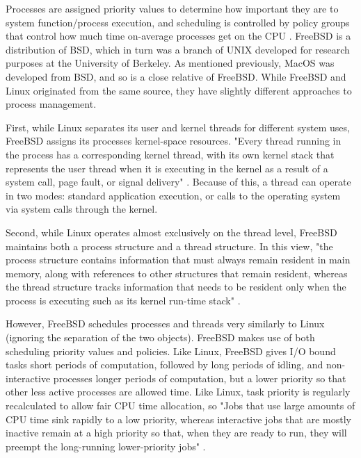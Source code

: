 \documentclass[10pt,draftclsnofoot,onecolumn]{IEEEtran}
\begin{document}
        Processes are assigned priority values to determine how important they are to system function/process execution, and scheduling is controlled by policy groups that control how much time on-average processes get on the CPU \cite{Ishkov_2015}. %
        FreeBSD is a distribution of BSD, which in turn was a branch of UNIX developed for research purposes at the University of Berkeley. As mentioned previously, MacOS was developed from BSD, and so is a close relative of FreeBSD. While FreeBSD and Linux originated from the same source, they have slightly different approaches to process management.\par
        First, while Linux separates its user and kernel threads for different system uses, FreeBSD assigns its processes kernel-space resources. "Every thread running in the process has a corresponding kernel thread, with its own kernel stack that represents the user thread when it is executing in the kernel as a result of a system call, page fault, or signal delivery" \cite{mckusick_neville-neil_watson_mckusick_2015}. Because of this, a thread can operate in two modes: standard application execution, or calls to the operating system via system calls through the kernel.\par
        Second, while Linux operates almost exclusively on the thread level, FreeBSD maintains both a process structure and a thread structure. In this view, "the process structure contains information that must always remain resident in main memory, along with references to other structures that remain resident, whereas the thread structure tracks information that needs to be resident only when the process is executing such as its kernel run-time stack" \cite{mckusick_neville-neil_watson_mckusick_2015}.\par
        However, FreeBSD schedules processes and threads very similarly to Linux (ignoring the separation of the two objects). FreeBSD makes use of both scheduling priority values and policies. Like Linux, FreeBSD gives I/O bound tasks short periods of computation, followed by long periods of idling, and non-interactive processes longer periods of computation, but a lower priority so that other less active processes are allowed time. Like Linux, task priority is regularly recalculated to allow fair CPU time allocation, so "Jobs that use large amounts of CPU time sink rapidly to a low priority, whereas interactive jobs that are mostly inactive remain at a high priority so that, when they are ready to run, they will preempt the long-running lower-priority jobs" \cite{mckusick_neville-neil_watson_mckusick_2015}.\par
        
	\newpage
    
	
\end{document}
